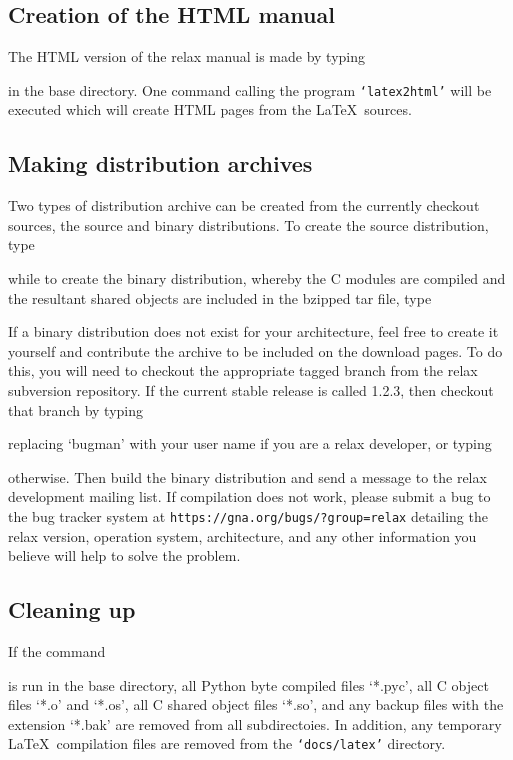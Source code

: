 \subsection{Creation of the HTML manual}

The HTML version of the relax manual is made by typing


in the base directory.  One command calling the program \texttt{`latex2html'} will be executed which will create HTML pages from the \LaTeX\ sources.


\subsection{Making distribution archives}

Two types of distribution archive can be created from the currently checkout sources, the source and binary distributions.  To create the source distribution, type 


while to create the binary distribution, whereby the C modules are compiled and the resultant shared objects are included in the bzipped tar file, type


If a binary distribution does not exist for your architecture, feel free to create it yourself and contribute the archive to be included on the download pages.  To do this, you will need to checkout the appropriate tagged branch from the relax subversion repository.  If the current stable release is called 1.2.3, then checkout that branch by typing


replacing `bugman' with your user name if you are a relax developer, or typing


otherwise.  Then build the binary distribution and send a message to the relax development mailing list.  If compilation does not work, please submit a bug to the bug tracker system at \texttt{https://gna.org/bugs/?group=relax} detailing the relax version, operation system, architecture, and any other information you believe will help to solve the problem.


\subsection{Cleaning up}

If the command


is run in the base directory, all Python byte compiled files `*.pyc', all C object files `*.o' and `*.os', all C shared object files `*.so', and any backup files with the extension `*.bak' are removed from all subdirectoies.  In addition, any temporary \LaTeX\ compilation files are removed from the \texttt{`docs/latex'} directory.
